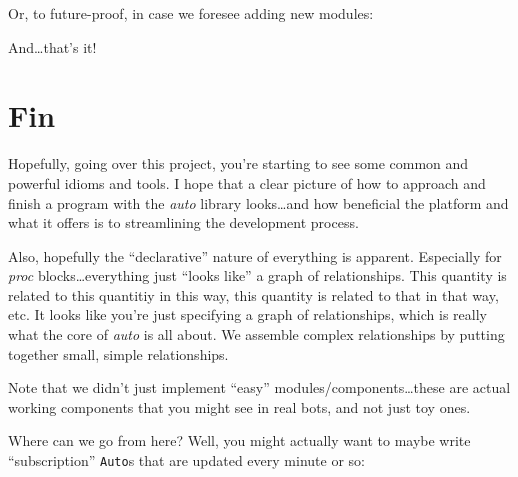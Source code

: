 \documentclass[]{article}
\newenvironment{Shaded}{}{}
\newcommand{\DataTypeTok}[1]{\textcolor[rgb]{0.56,0.13,0.00}{{#1}}}
\newcommand{\StringTok}[1]{\textcolor[rgb]{0.25,0.44,0.63}{{#1}}}
\newcommand{\CommentTok}[1]{\textcolor[rgb]{0.38,0.63,0.69}{\textit{{#1}}}}
\newcommand{\OtherTok}[1]{\textcolor[rgb]{0.00,0.44,0.13}{{#1}}}
\newcommand{\FunctionTok}[1]{\textcolor[rgb]{0.02,0.16,0.49}{{#1}}}
\newcommand{\NormalTok}[1]{{#1}}
\begin{document}
Or, to future-proof, in case we foresee adding new modules:

\begin{Shaded}
\end{Shaded}

And\ldots{}that's it!

\section{Fin}\label{fin}

Hopefully, going over this project, you're starting to see some common and
powerful idioms and tools. I hope that a clear picture of how to approach and
finish a program with the \emph{auto} library looks\ldots{}and how beneficial
the platform and what it offers is to streamlining the development process.

Also, hopefully the ``declarative'' nature of everything is apparent. Especially
for \emph{proc} blocks\ldots{}everything just ``looks like'' a graph of
relationships. This quantity is related to this quantitiy in this way, this
quantity is related to that in that way, etc. It looks like you're just
specifying a graph of relationships, which is really what the core of
\emph{auto} is all about. We assemble complex relationships by putting together
small, simple relationships.

Note that we didn't just implement ``easy'' modules/components\ldots{}these are
actual working components that you might see in real bots, and not just toy
ones.

Where can we go from here? Well, you might actually want to maybe write
``subscription'' \texttt{Auto}s that are updated every minute or so:
\end{document}
